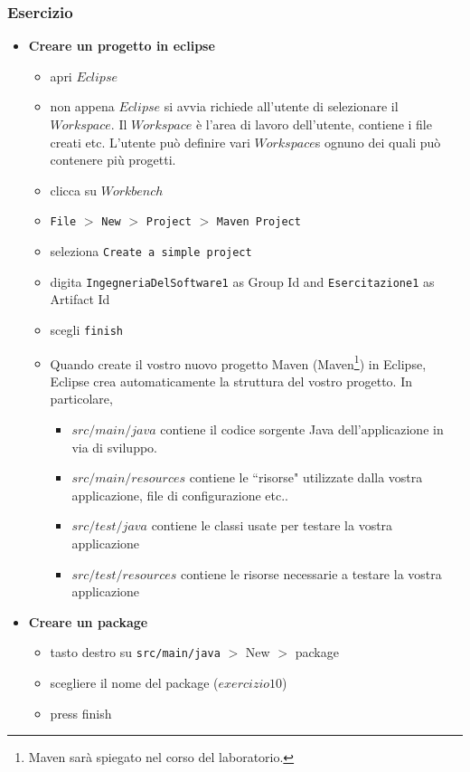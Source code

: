 \documentclass{article}
\theoremstyle{definition}
\begin{document}
\subsubsection{Esercizio}

\begin{itemize}
\item \textbf{Creare un progetto in eclipse}
\begin{itemize}
\item apri $Eclipse$
\item non appena $Eclipse$ si avvia richiede all'utente di selezionare il $Workspace$. Il $Workspace$ \`e l'area di lavoro dell'utente, contiene i file creati etc. L'utente pu\`o definire vari $Workspace$s ognuno dei quali pu\`o contenere pi\`u progetti.
\item clicca su $Workbench$ 
\item \texttt{File} $>$ \texttt{New} $>$ \texttt{Project} $>$ \texttt{Maven Project}
\item seleziona \texttt{Create a simple project}
\item digita \texttt{IngegneriaDelSoftware1} as Group Id and \texttt{Esercitazione1} as Artifact Id
\item scegli \texttt{finish}
\item Quando create il vostro nuovo progetto Maven (Maven\footnote{Maven sar\`a spiegato nel corso del laboratorio.}) in Eclipse, Eclipse crea automaticamente la struttura del vostro progetto. In particolare, 
\begin{itemize}
\item $src/main/java$ contiene il codice sorgente Java dell'applicazione in via di sviluppo.
\item $src/main/resources$ contiene le ``risorse" utilizzate dalla vostra applicazione, file di configurazione etc..
\item $src/test/java$ contiene le classi usate per testare la vostra applicazione
\item $src/test/resources$ contiene le risorse necessarie a testare la vostra applicazione
\end{itemize}
\end{itemize}
\end{itemize}



\begin{itemize}
\item \textbf{Creare un package}
\begin{itemize}
\item tasto destro su \texttt{src/main/java} $>$ New $>$ package 
\item scegliere il nome del package ($exercizio10$)
\item press finish
\end{itemize}
\end{itemize}
\end{document}
